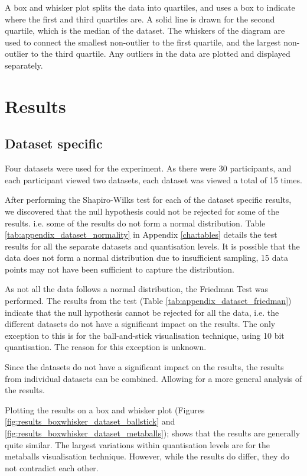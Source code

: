 A box and whisker plot splits the data into quartiles, and uses a box to
indicate where the first and third quartiles are. A solid line is drawn for the
second quartile, which is the median of the dataset. The whiskers of the
diagram are used to connect the smallest non-outlier to the first quartile, and
the largest non-outlier to the third quartile. Any outliers in the data are
plotted and displayed separately.


\section{Results}
\label{sec:results_results}

\subsection*{Dataset specific}
\label{sub:results_results_dataset}

Four datasets were used for the experiment. As there were 30 participants, and
each participant viewed two datasets, each dataset was viewed a total of 15
times.

After performing the Shapiro-Wilks test for each of the dataset specific
results, we discovered that the null hypothesis could not be rejected for some
of the results. i.e. some of the results do not form a normal distribution.
Table \ref{tab:appendix_dataset_normality} in Appendix \ref{cha:tables} details
the test results for all the separate datasets and quantisation levels. It is
possible that the data does not form a normal distribution due to insufficient
sampling, 15 data points may not have been sufficient to capture the
distribution.

As not all the data follows a normal distribution, the Friedman Test was
performed. The results from the test (Table
\ref{tab:appendix_dataset_friedman}) indicate that the null hypothesis cannot
be rejected for all the data, i.e. the different datasets do not have a
significant impact on the results. The only exception to this is for the
ball-and-stick visualisation technique, using 10 bit quantisation. The reason
for this exception is unknown.

Since the datasets do not have a significant impact on the results, the results
from individual datasets can be combined. Allowing for a more general analysis
of the results.

Plotting the results on a box and whisker plot (Figures
\ref{fig:results_boxwhisker_dataset_ballstick} and
\ref{fig:results_boxwhisker_dataset_metaballs}); shows that the results are
generally quite similar. The largest variations within quantisation levels are
for the metaballs visualisation technique. However, while the results do
differ, they do not contradict each other.

